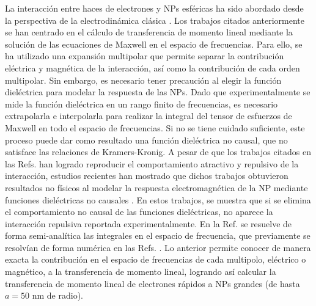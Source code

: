 La interacción entre haces de electrones y NPs esféricas ha sido abordado desde la perspectiva de la electrodinámica clásica \cite{GarciadeAbajo0, PRBCoronado, Lagos2, Batson2, xu2010transmission}. Los trabajos citados anteriormente se han centrado en el cálculo de transferencia de momento lineal mediante la solución de las ecuaciones de Maxwell en el espacio de frecuencias. Para ello, se ha utilizado una expansión multipolar que permite separar la contribución eléctrica y magnética de la interacción, así como la contribución de cada orden multipolar. Sin embargo, es necesario tener precaución al elegir la función dieléctrica para modelar la respuesta de las NPs. Dado que experimentalmente se mide la función dieléctrica en un rango finito de frecuencias, es necesario extrapolarla e interpolarla para realizar la integral del tensor de esfuerzos de Maxwell en todo el espacio de frecuencias. Si no se tiene cuidado suficiente, este proceso puede dar como resultado una función dieléctrica no causal, que no satisface las relaciones de Kramers-Kronig. A pesar de que los trabajos citados en las Refs. \cite{GarciadeAbajo0, PRBCoronado, Lagos2, Batson2, xu2010transmission} han logrado reproducir el comportamiento atractivo y repulsivo de la interacción, estudios recientes han mostrado que dichos trabajos obtuvieron resultados no físicos al modelar la respuesta electromagnética de la NP mediante funciones dieléctricas no causales \cite{castrejon2021effects, castrejon2021phdthesis}. En estos trabajos, se muestra que si se elimina el comportamiento no causal de las funciones dieléctricas, no aparece la interacción repulsiva reportada experimentalmente. En la Ref. \cite{castrejon2021phdthesis} se resuelve de forma semi-analítica las integrales en el espacio de frecuencia, que previamente se resolvían de forma numérica en las Refs. \cite{GarciadeAbajo0, PRBCoronado, Lagos2, Batson2, xu2010transmission}. Lo anterior permite conocer de manera exacta la contribución en el espacio de frecuencias de cada multipolo, eléctrico o magnético, a la transferencia de momento lineal, logrando así calcular la transferencia de momento lineal de electrones rápidos a NPs grandes (de hasta $a=50$ nm de radio).



